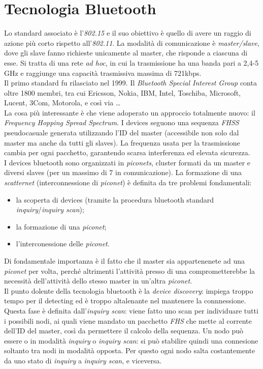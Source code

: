 \section{Tecnologia Bluetooth}
Lo standard associato è l'\textit{802.15} e il suo obiettivo è quello di avere un raggio di azione più corto rispetto all'\textit{802.11}.
La modalità di comunicazione è \textit{master/slave}, dove gli slave fanno richieste unicamente al master, che risponde a ciascuna di esse.
Si tratta di una rete \textit{ad hoc}, in cui la trasmissione ha una banda pari a 2,4-5 GHz e raggiunge una capacità trasmissiva massima di 721kbps. \\
Il primo standard fu rilasciato nel 1999. Il \textit{Bluetooth Special Interest Group} conta oltre 1800 membri, tra cui Ericsson, Nokia, IBM, Intel, Toschiba, Microsoft, Lucent, 3Com, Motorola, e così via \ldots \\
La cosa più interessante è che viene adoperato un approccio totalmente nuovo: il \textit{Frequency Hopping Spread Spectrum}. I devices seguono una sequenza \textit{FHSS} pseudocasuale generata utilizzando l'ID del master (accessibile non solo dal master ma anche da tutti gli slaves). La frequenza usata per la trasmissione cambia per ogni pacchetto, garantendo scarsa interferenza ed elevata sicurezza. \\
I devices bluetooth sono organizzati in \textit{piconets}, cluster formati da un master e diversi slaves (per un massimo di 7 in comunicazione). La formazione di una \textit{scatternet} (interconnessione di \textit{piconet}) è definita da tre problemi fondamentali:
\begin{itemize}
	\item la scoperta di devices (tramite la procedura bluetooth standard \textit{inquiry}/\textit{inquiry scan});
	\item la formazione di una \textit{piconet};
	\item l'interconessione delle \textit{piconet}.
\end{itemize}
Di fondamentale importanza è il fatto che il master sia appartenenete ad una \textit{piconet} per volta, perché altrimenti l'attività presso di una comprometterebbe la necessità dell'attività dello stesso master in un'altra \textit{piconet}. \\
Il punto dolente della tecnologia bluetooth è la \textit{device discovery}: impiega troppo tempo per il detecting ed è troppo altalenante nel mantenere la connnessione. Questa fase è definita dall'\textit{inquiry scan}: viene fatto uno scan per individuare tutti i possibili nodi, ai quali viene mandato un pacchetto \textit{FHS} che mette al corrente dell'ID del master, così da permettere il calcolo della sequenza. Un nodo può essere o in modalità \textit{inquiry} o \textit{inquiry scan}: si può stabilire quindi una connesione soltanto tra nodi in modalità opposta. Per questo ogni nodo salta costantemente da uno stato di \textit{inquiry} a \textit{inquiry scan}, e viceversa. \\
